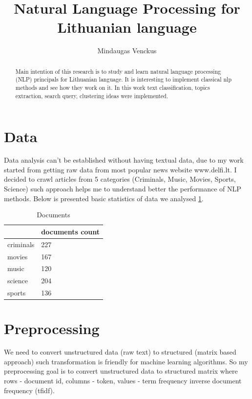 \documentclass{article}
\begin{document}
\title{Natural Language Processing for Lithuanian language}
\author{Mindaugas Venckus}

\maketitle

\begin{abstract}
Main intention of this research is to study and learn natural language processing (NLP) principals  for Lithuanian language. It is interesting to implement classical nlp methods and see how they work on it. In this work text classification, topics extraction, search query, clustering ideas were implemented.
\end{abstract}

\section{Data}
Data analysis can't be established without having textual data, due to my work started from getting raw data from most popular news website www.delfi.lt. I decided to crawl articles from 5 categories (Criminals, Music, Movies, Sports, Science) such approach helps me to understand better the performance of NLP methods. Below is presented basic statistics of data we analysed  \ref{DocumentsTable}.
\begin{table}[htb]
\centering
\caption{Documents}
\label{DocumentsTable}
\begin{tabular}{|l|l|}
\hline
          & documents count \\ \hline
criminals & 227             \\ \hline
movies    & 167             \\ \hline
music     & 120             \\ \hline
science   & 204             \\ \hline
sports    & 136             \\ \hline
\end{tabular}
\end{table}
\section{Preprocessing}
 
We need to convert unstructured data (raw text) to structured (matrix based approach) such transformation is friendly for machine learning algorithms. So my preprocessing goal is to convert unstructured data to  structured matrix where rows - document id, columns - token, values - term frequency inverse document frequency (tfidf).
\end{document}
